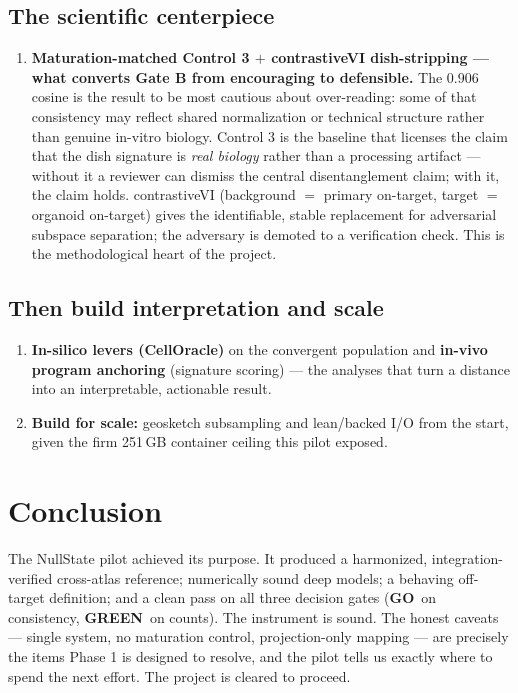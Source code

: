 \documentclass[11pt]{article}
\newcommand{\GO}{\textcolor{nsgreen}{\textbf{GO}}}
\newcommand{\GREEN}{\textcolor{nsgreen}{\textbf{GREEN}}}
\begin{document}
\subsection*{The scientific centerpiece}
\begin{enumerate}[label=\textbf{\arabic*.},start=3]
\item \textbf{Maturation-matched Control 3 $+$ contrastiveVI dish-stripping --- what converts Gate B from encouraging to defensible.} The $0.906$ cosine is the result to be most cautious about over-reading: some of that consistency may reflect shared normalization or technical structure rather than genuine in-vitro biology. Control 3 is the baseline that licenses the claim that the dish signature is \emph{real biology} rather than a processing artifact --- without it a reviewer can dismiss the central disentanglement claim; with it, the claim holds. contrastiveVI (background $=$ primary on-target, target $=$ organoid on-target) gives the identifiable, stable replacement for adversarial subspace separation; the adversary is demoted to a verification check. This is the methodological heart of the project.
\end{enumerate}

\subsection*{Then build interpretation and scale}
\begin{enumerate}[label=\textbf{\arabic*.},start=4]
\item \textbf{In-silico levers (CellOracle)} on the convergent population and \textbf{in-vivo program anchoring} (signature scoring) --- the analyses that turn a distance into an interpretable, actionable result.
\item \textbf{Build for scale:} geosketch subsampling and lean/backed I/O from the start, given the firm 251\,GB container ceiling this pilot exposed.
\end{enumerate}

\section{Conclusion}
The NullState pilot achieved its purpose. It produced a harmonized, integration-verified cross-atlas reference; numerically sound deep models; a behaving off-target definition; and a clean pass on all three decision gates (\GO\ on consistency, \GREEN\ on counts). The instrument is sound. The honest caveats --- single system, no maturation control, projection-only mapping --- are precisely the items Phase 1 is designed to resolve, and the pilot tells us exactly where to spend the next effort. The project is cleared to proceed.
\end{document}
